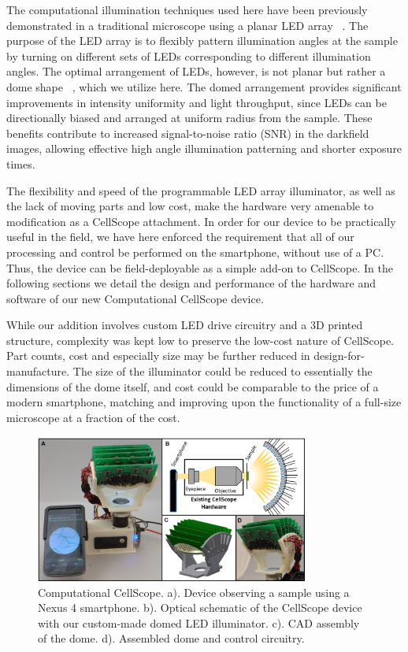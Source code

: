 The computational illumination techniques used here have been previously demonstrated in a traditional microscope using a planar LED array ~\cite{Zheng2011,Zheng2013,Tian14,zijiMulti,tian20153d}. The purpose of the LED array is to flexibly pattern illumination angles at the sample by turning on different sets of LEDs corresponding to different illumination angles. The optimal arrangement of LEDs, however, is not planar but rather a dome shape ~\cite{Dominguez:14}, which we utilize here. The domed arrangement provides significant improvements in intensity uniformity and light throughput, since LEDs can be directionally biased and arranged at uniform radius from the sample. These benefits contribute to increased signal-to-noise ratio (SNR) in the darkfield images, allowing effective high angle illumination patterning and shorter exposure times.

The flexibility and speed of the programmable LED array illuminator, as well as the lack of moving parts and low cost, make the hardware very amenable to modification as a CellScope attachment. In order for our device to be practically useful in the field, we have here enforced the requirement that all of our processing and control be performed on the smartphone, without use of a PC. Thus, the device can be field-deployable as a simple add-on to CellScope. In the following sections we detail the design and performance of the hardware and software of our new Computational CellScope device.

While our addition involves custom LED drive circuitry and a 3D printed structure, complexity was kept low to preserve the low-cost nature of CellScope. Part counts, cost and especially size may be further reduced in design-for-manufacture. The size of the illuminator could be reduced to essentially the dimensions of the dome itself, and cost could be comparable to the price of a modern smartphone, matching and improving upon the functionality of a full-size microscope at a fraction of the cost.

\begin{figure} [ht]
\begin{center}
\includegraphics[width=0.8\textwidth]{figures/fig_ccs_system.png}
\end{center}
\caption {{Computational CellScope.} {a).} Device observing a sample using a Nexus 4 smartphone. {b).} Optical schematic of the CellScope device with our custom-made domed LED illuminator. {c).} CAD assembly of the dome. {d).} Assembled dome and control circuitry.}
\label{fig:fabrication:device}
\end{figure}

